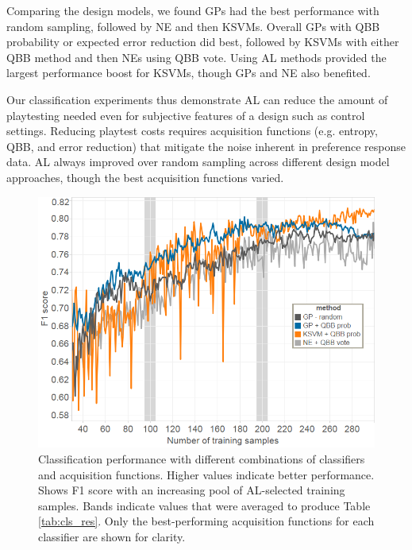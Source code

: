 \documentclass{sig-alternate}
\begin{document}
Comparing the design models, we found GPs had the best performance with random sampling, followed by NE and then KSVMs.
Overall GPs with QBB probability or expected error reduction did best, followed by KSVMs with either QBB method and then NEs using QBB vote.
Using AL methods provided the largest performance boost for KSVMs, though GPs and NE also benefited.


Our classification experiments thus demonstrate AL can reduce the amount of playtesting needed even for subjective features of a design such as control settings.
Reducing playtest costs requires acquisition functions (e.g. entropy, QBB, and error reduction) that mitigate the noise inherent in preference response data.
AL always improved over random sampling across different design model approaches, though the best acquisition functions varied.


\begin{figure}[tb]
\centering
\includegraphics[width=\linewidth]{classification_experiment_happy}
\caption{Classification performance with different combinations of classifiers and acquisition functions.
Higher values indicate better performance.
Shows F1 score with an increasing pool of AL-selected training samples.
Bands indicate values that were averaged to produce Table \ref{tab:cls_res}.
Only the best-performing acquisition functions for each classifier are shown for clarity.
}
\label{fig:cls_happy}
\end{figure}
\end{document}
